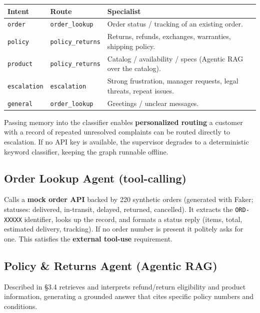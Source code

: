 \documentclass[11pt,a4paper]{article}
\newcommand{\code}[1]{\texttt{#1}}
\begin{document}
\begin{center}
\begin{tabularx}{\textwidth}{@{}>{\raggedright\arraybackslash}p{2.1cm}>{\raggedright\arraybackslash}p{2.8cm}Y@{}}
\toprule
\textbf{Intent} & \textbf{Route} & \textbf{Specialist} \\
\midrule
\code{order}      & \code{order\_lookup}    & Order status / tracking of an existing order. \\
\code{policy}     & \code{policy\_returns}  & Returns, refunds, exchanges, warranties, shipping policy. \\
\code{product}    & \code{policy\_returns}  & Catalog / availability / specs (Agentic RAG over the catalog). \\
\code{escalation} & \code{escalation}       & Strong frustration, manager requests, legal threats, repeat issues. \\
\code{general}    & \code{order\_lookup}    & Greetings / unclear messages. \\
\bottomrule
\end{tabularx}
\end{center}

Passing memory into the classifier enables \textbf{personalized routing} \textemdash{} a customer
with a record of repeated unresolved complaints can be routed directly to escalation. If no API key
is available, the supervisor degrades to a deterministic keyword classifier, keeping the graph
runnable offline.

\subsection{Order Lookup Agent (tool-calling)}
Calls a \textbf{mock order API} backed by 220 synthetic orders (generated with Faker; statuses:
delivered, in-transit, delayed, returned, cancelled). It extracts the \code{ORD-XXXXX} identifier,
looks up the record, and formats a status reply (items, total, estimated delivery, tracking). If no
order number is present it politely asks for one. This satisfies the \textbf{external tool-use}
requirement.

\subsection{Policy \& Returns Agent (Agentic RAG)}
Described in \S3.4 \textemdash{} retrieves and interprets refund/return eligibility and product
information, generating a grounded answer that cites specific policy numbers and conditions.
\end{document}
